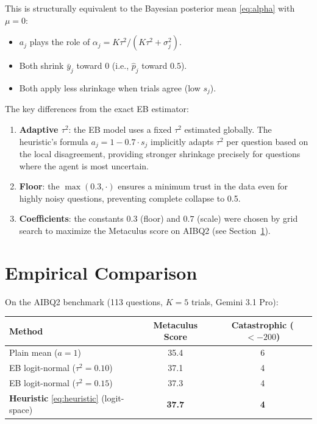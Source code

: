 \documentclass[11pt]{article}
\begin{document}
This is structurally equivalent to the Bayesian posterior mean \eqref{eq:alpha}
with $\mu = 0$:
\begin{itemize}
  \item $a_j$ plays the role of $\alpha_j = K\tau^2 / (K\tau^2 + \sigma_j^2)$.
  \item Both shrink $\bar{y}_j$ toward $0$ (i.e., $\hat{p}_j$ toward $0.5$).
  \item Both apply less shrinkage when trials agree (low $s_j$).
\end{itemize}

The key differences from the exact EB estimator:
\begin{enumerate}
  \item \textbf{Adaptive $\tau^2$}: the EB model uses a fixed $\tau^2$
    estimated globally.  The heuristic's formula $a_j = 1 - 0.7 \cdot s_j$
    implicitly adapts $\tau^2$ per question based on the local disagreement,
    providing stronger shrinkage precisely for questions where the agent is
    most uncertain.
  \item \textbf{Floor}: the $\max(0.3, \cdot)$ ensures a minimum trust in
    the data even for highly noisy questions, preventing complete collapse
    to 0.5.
  \item \textbf{Coefficients}: the constants $0.3$ (floor) and $0.7$ (scale)
    were chosen by grid search to maximize the Metaculus score on AIBQ2
    (see Section~\ref{sec:empirical}).
\end{enumerate}

\section{Empirical Comparison}
\label{sec:empirical}

On the AIBQ2 benchmark (113 questions, $K=5$ trials, Gemini 3.1 Pro):

\begin{center}
\begin{tabular}{lcc}
  \hline
  Method & Metaculus Score & Catastrophic ($< -200$) \\
  \hline
  Plain mean ($a = 1$) & 35.4 & 6 \\
  EB logit-normal ($\tau^2 = 0.10$) & 37.1 & 4 \\
  EB logit-normal ($\tau^2 = 0.15$) & 37.3 & 4 \\
  \textbf{Heuristic} \eqref{eq:heuristic} (logit-space) & \textbf{37.7} & \textbf{4} \\
  \hline
\end{tabular}
\end{center}
\end{document}

